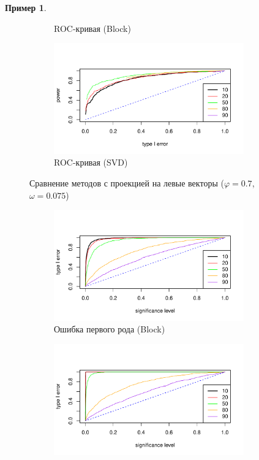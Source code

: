 \documentclass[specialist,
substylefile = spbu_report.rtx,
subf,href,colorlinks=true, 12pt]{disser}
\theoremstyle{definition}
\newtheorem{example}{Пример}
\begin{document}
\begin{example}
\begin{figure}[H]
\begin{subfigure}[t]{0.5\textwidth}
		\caption{ROC-кривая (Block)}
		\label{fig:block_ev_r}
	\end{subfigure}\hspace{\fill}
	\begin{subfigure}[t]{0.5\textwidth}
		\centering
		\includegraphics[width=0.9\textwidth]{img/roc_mssa_ev.pdf}
		\caption{ROC-кривая (SVD)}
	\end{subfigure}
	\caption{Сравнение методов с проекцией на левые векторы ($\varphi=0.7$, $\omega=0.075$)}
	\label{fig:block_ev}
\end{figure}
\begin{figure}[H]
	\captionsetup[subfigure]{justification=Centering}
	\begin{subfigure}[t]{0.5\textwidth}
		\centering
		\includegraphics[width=0.9\textwidth]{img/type1error_block_fa.pdf}
		\caption{Ошибка первого рода (Block)}
		\label{fig:block_fa_a}
	\end{subfigure}\hspace{\fill}
	\begin{subfigure}[t]{0.5\textwidth}
		\centering
		\includegraphics[width=0.9\textwidth]{img/type1error_mssa_fa.pdf}

\end{subfigure}
\end{figure}
\end{example}
\end{document}
